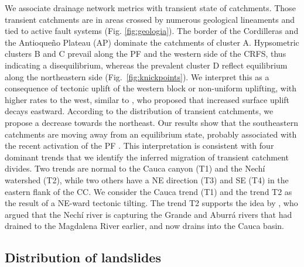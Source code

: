 \documentclass[draft]{agujournal2019}
\begin{document}
\par We associate drainage network metrics with transient state of catchments. Those transient catchments are in areas crossed by numerous geological lineaments and tied to active fault systems (Fig. \ref{fig:geologia}). The border of the Cordilleras and the Antioqueño Plateau (AP) dominate the catchments of cluster A. Hypsometric clusters B and C prevail along the PF and the western side of the CRFS, thus indicating a disequilibrium, whereas the prevalent cluster D reflect equilibrium along the northeastern side (Fig.~\ref{fig:knickpoints}). We interpret this as a consequence of tectonic uplift of the western block or non-uniform uplifting, with higher rates to the west, similar to , who proposed that increased surface uplift decays eastward. According to the distribution of transient catchments, we propose a decrease towards the northeast. Our results show that the southeastern catchments are moving away from an equilibrium state, probably associated with the recent activation of the PF \cite{acosta2007, feininger1970}. This interpretation is consistent with four dominant trends that we identify the inferred migration of transient catchment divides. Two trends are normal to the Cauca canyon (T1) and the Nechí watershed (T2), while two others have a NE direction (T3) and SE (T4) in the eastern flank of the CC. We consider the Cauca trend (T1)  and the trend T2 as the result of a NE-ward tectonic tilting. The trend T2 supports the idea by , who argued that the Nechí river is capturing the Grande and Aburrá rivers that had drained to the Magdalena River earlier, and now drains into the Cauca basin. 

\subsection{Distribution of landslides}
\end{document}
